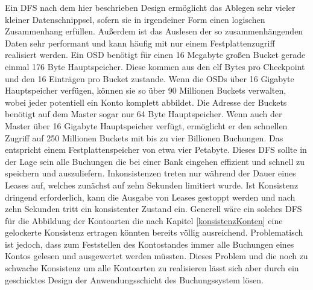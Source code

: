 \documentclass[12pt,oneside,a4paper,parskip]{scrbook}
\begin{document}
Ein DFS nach dem hier beschrieben Design ermöglicht das Ablegen sehr vieler kleiner Datenschnippsel, sofern sie in irgendeiner Form einen logischen Zusammenhang erfüllen. Außerdem ist das Auslesen der so zusammenhängenden Daten sehr performant und kann häufig mit nur einem Festplattenzugriff realisiert werden. Ein OSD benötigt für einen 16 Megabyte großen Bucket gerade einmal 176 Byte Hauptspeicher. Diese kommen aus den elf Bytes pro Checkpoint und den 16 Einträgen pro Bucket zustande. Wenn die OSDs über 16 Gigabyte Hauptspeicher verfügen, können sie so über 90 Millionen Buckets verwalten, wobei jeder potentiell ein Konto komplett abbildet. Die Adresse der Buckets benötigt auf dem Master sogar nur 64 Byte Hauptspeicher. Wenn auch der Master über 16 Gigabyte Hauptspeicher verfügt, ermöglicht er den schnellen Zugriff auf 250 Millionen Buckets mit bis zu vier Billionen Buchungen. Das entspricht einem Festplattenspeicher von etwa vier Petabyte. Dieses DFS sollte in der Lage sein alle Buchungen die bei einer Bank eingehen effizient und schnell zu speichern und auszuliefern. Inkonsistenzen treten nur während der Dauer eines Leases auf, welches zunächst auf zehn Sekunden limitiert wurde. Ist Konsistenz dringend erforderlich, kann die Ausgabe von Leases gestoppt werden und nach zehn Sekunden tritt ein konsistenter Zustand ein. Generell wäre ein solches DFS für die Abbildung der Kontoarten die nach Kapitel \ref{konsistenzKonten} eine gelockerte Konsistenz ertragen könnten bereits völlig ausreichend. Problematisch ist jedoch, dass zum Feststellen des Kontostandes immer alle Buchungen eines Kontos gelesen und ausgewertet werden müssten. Dieses Problem und die noch zu schwache Konsistenz um alle Kontoarten zu realisieren lässt sich aber durch ein geschicktes Design der Anwendungsschicht des Buchungssystem lösen.
\end{document}
